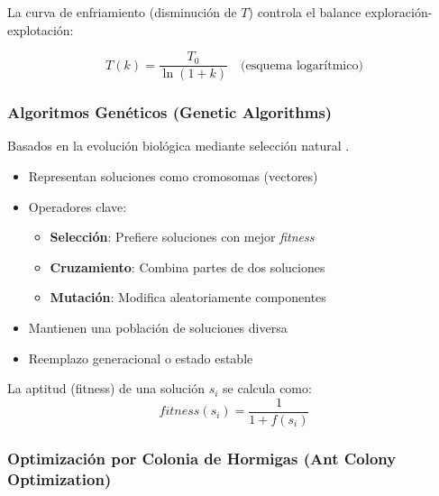 La curva de enfriamiento (disminución de $T$) controla el balance exploración-explotación:

\begin{equation}
T(k) = \frac{T_0}{\ln(1 + k)} \quad \text{(esquema logarítmico)}
\end{equation}



\subsubsection{Algoritmos Genéticos (Genetic Algorithms)}
\label{subsec:algoritmos-geneticos}

Basados en la evolución biológica mediante selección natural \cite{Holland1992}.

\begin{itemize}
    \item Representan soluciones como cromosomas (vectores)
    \item Operadores clave:
    \begin{itemize}
        \item \textbf{Selección}: Prefiere soluciones con mejor \textit{fitness}
        \item \textbf{Cruzamiento}: Combina partes de dos soluciones
        \item \textbf{Mutación}: Modifica aleatoriamente componentes
    \end{itemize}
    \item Mantienen una población de soluciones diversa
    \item Reemplazo generacional o estado estable
\end{itemize}

La aptitud (fitness) de una solución $s_i$ se calcula como:
\begin{equation}
fitness(s_i) = \frac{1}{1 + f(s_i)}
\end{equation}


\subsubsection{Optimización por Colonia de Hormigas (Ant Colony Optimization)}
\label{subsec:tabu-search}

